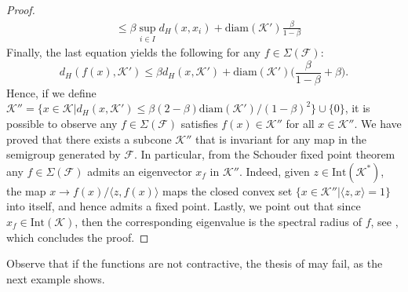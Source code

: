 \documentclass{article}
\newcommand{\family}{\mathcal{F}}
\newcommand{\cone}{\mathcal{K}}
\newcommand{\interior}{\mathrm{Int}}
\newcommand{\dist}{d_H}
\begin{document}
\begin{proof}
\begin{equation}
\begin{aligned}
    &\leq \beta \sup_{i\in I}d_H(x,x_i)+\mathrm{diam}(\cone')\frac{\beta}{1-\beta}
\end{aligned}
\end{equation}
Finally, the last equation yields the following for any $f\in \Sigma(\family)$:
\begin{equation}\label{THM_family_has_invariant_cone}
\dist(f(x),\cone')\leq 
    \beta \dist(x,\cone')+\mathrm{diam}(\cone')\Big(\frac{\beta}{1-\beta}+\beta\Big).
\end{equation}
%
Hence, if we define $\cone''=\{x\in\cone|\dist(x,\cone')\leq\beta(2-\beta)\mathrm{diam}(\cone')/(1-\beta)^2 \}\cup \{0\}$, it is possible to observe any $f\in \Sigma(\family)$ satisfies $f(x)\in \cone''$ for all $x\in \cone''$.
We have proved that there exists a subcone $\cone''$ that is invariant for any map in the semigroup generated by $\family$. In particular, from the Schouder fixed point theorem any $f\in \Sigma(\family)$ admits an eigenvector $x_f$ in $\cone''$. 
Indeed, given $z\in \interior(\cone^*)$, the map $x\rightarrow f(x)/\langle z,f(x)\rangle$ maps the closed convex set $\{x\in \cone''| \langle z,x \rangle=1\}$ into itself, and hence admits a fixed point.
Lastly, we point out that since $x_f\in \interior(\cone)$, then the corresponding eigenvalue is the spectral radius of $f$, see , which concludes the proof. 

\end{proof}

    Observe that if the functions are not contractive, the thesis of  may fail, as the next example shows.
\end{document}
